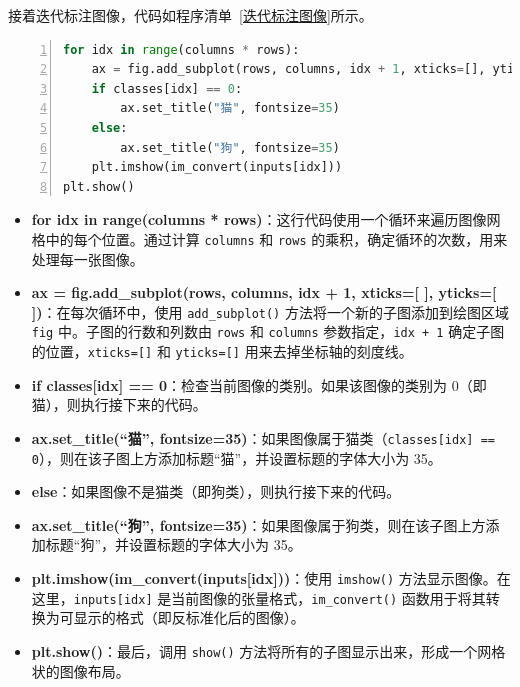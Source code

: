 接着迭代标注图像，代码如程序清单~\ref{迭代标注图像}所示。
\begin{lstlisting}[language={python},label={迭代标注图像},caption={迭代标注图像}, basicstyle=\footnotesize\ttfamily, breaklines=true, numbers=left, frame=single,keepspaces=true,showstringspaces=false]
for idx in range(columns * rows):
    ax = fig.add_subplot(rows, columns, idx + 1, xticks=[], yticks=[])
    if classes[idx] == 0:
        ax.set_title("猫", fontsize=35)
    else:
        ax.set_title("狗", fontsize=35)
    plt.imshow(im_convert(inputs[idx]))
plt.show()
\end{lstlisting}
\begin{itemize}
    \item \textbf{for idx in range(columns * rows)}：这行代码使用一个循环来遍历图像网格中的每个位置。通过计算 \texttt{columns} 和 \texttt{rows} 的乘积，确定循环的次数，用来处理每一张图像。
    
    \item \textbf{ax = fig.add\_subplot(rows, columns, idx + 1, xticks=[ ], yticks=[ ])}：在每次循环中，使用 \texttt{add\_subplot()} 方法将一个新的子图添加到绘图区域 \texttt{fig} 中。子图的行数和列数由 \texttt{rows} 和 \texttt{columns} 参数指定，\texttt{idx + 1} 确定子图的位置，\texttt{xticks=[]} 和 \texttt{yticks=[]} 用来去掉坐标轴的刻度线。
    
    \item \textbf{if classes[idx] == 0}：检查当前图像的类别。如果该图像的类别为 0（即猫），则执行接下来的代码。
    
    \item \textbf{ax.set\_title(“猫”, fontsize=35)}：如果图像属于猫类（\texttt{classes[idx] == 0}），则在该子图上方添加标题“猫”，并设置标题的字体大小为 35。
    
    \item \textbf{else}：如果图像不是猫类（即狗类），则执行接下来的代码。
    
    \item \textbf{ax.set\_title(“狗”, fontsize=35)}：如果图像属于狗类，则在该子图上方添加标题“狗”，并设置标题的字体大小为 35。
    
    \item \textbf{plt.imshow(im\_convert(inputs[idx]))}：使用 \texttt{imshow()} 方法显示图像。在这里，\texttt{inputs[idx]} 是当前图像的张量格式，\texttt{im\_convert()} 函数用于将其转换为可显示的格式（即反标准化后的图像）。
    
    \item \textbf{plt.show()}：最后，调用 \texttt{show()} 方法将所有的子图显示出来，形成一个网格状的图像布局。
\end{itemize}

